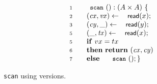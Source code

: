 \begin{wrapfigure}[12]{t}{0.4\textwidth} 
%
% 
\begin{minipage}[t]{.4\textwidth}
\[\hfill
\begin{array}{rl}
\num{1} & \esc{scan}\ () : ( A \times A )~ \{ \\ 
\num{2} & ~~~ (\var{cx}, \var{vx}) \tbnd \act{read}(\x);\\
\num{3} & ~~~ (\var{cy}, \_ ) \tbnd \act{read}(\y);\\
\num{5} & ~~~ (\_ , \var{tx}) \tbnd \act{read}(\x);\\
\num{5} & ~~~ \kw{if}\ vx = tx \\
\num{6} & ~~~ \kw{then}\ \kw{return}\ (\var{cx},\var{cy})\\
\num{7} & ~~~ \kw{else}\ \esc{scan}\ (); \}
\end{array}\hfill
\]
\end{minipage}
%
%
\caption{{\tt scan} using versions.}
\label{fig:readpair}
\end{wrapfigure}

